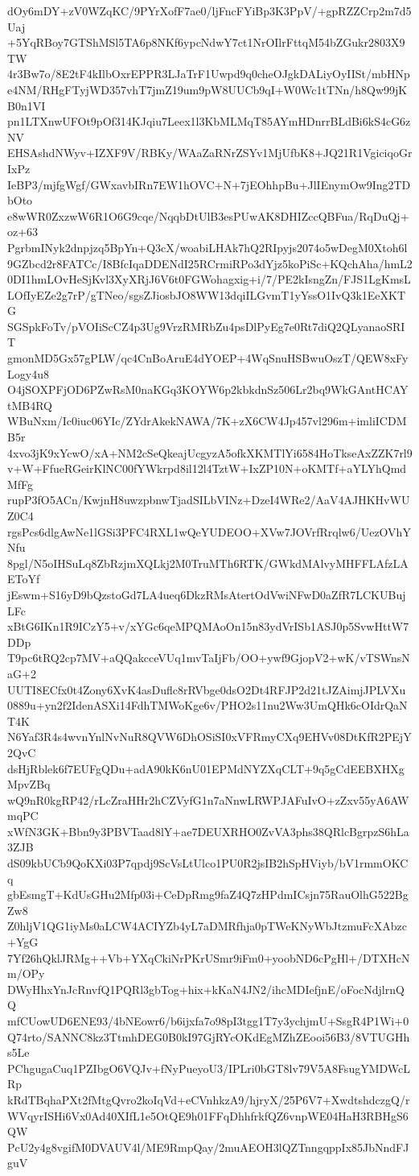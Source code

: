 dOy6mDY+zV0WZqKC/9PYrXofF7ae0/ljFncFYiBp3K3PpV/+gpRZZCrp2m7d5Uaj
+5YqRBoy7GTShMSl5TA6p8NKf6ypcNdwY7ct1NrOIlrFttqM54bZGukr2803X9TW
4r3Bw7o/8E2tF4kIlbOxrEPPR3LJaTrF1Uwpd9q0cheOJgkDALiyOyIISt/mbHNp
e4NM/RHgFTyjWD357vhT7jmZ19um9pW8UUCb9qI+W0Wc1tTNn/h8Qw99jKB0n1VI
pn1LTXnwUFOt9pOf314KJqiu7Leex1l3KbMLMqT85AYmHDnrrBLdBi6kS4cG6zNV
EHSAshdNWyv+IZXF9V/RBKy/WAaZaRNrZSYv1MjUfbK8+JQ21R1VgiciqoGrIxPz
IeBP3/mjfgWgf/GWxavbIRn7EW1hOVC+N+7jEOhhpBu+JlIEnymOw9Ing2TDbOto
e8wWR0ZxzwW6R1O6G9cqe/NqqbDtUlB3esPUwAK8DHIZccQBFua/RqDuQj+oz+63
PgrbmINyk2dnpjzq5BpYn+Q3cX/woabiLHAk7hQ2RIpyjs2074o5wDegM0Xtoh6l
9GZbcd2r8FATCc/I8BfcIqaDDENdI25RCrmiRPo3dYjz5koPiSc+KQchAha/hmL2
0DI1hmLOvHeSjKvl3XyXRjJ6V6t0FGWohagxig+i/7/PE2kIsngZn/FJS1LgKmsL
LOfIyEZe2g7rP/gTNeo/sgsZJiosbJO8WW13dqiILGvmT1yYssO1IvQ3k1EeXKTG
SGSpkFoTv/pVOIiScCZ4p3Ug9VrzRMRbZu4psDlPyEg7e0Rt7diQ2QLyanaoSRIT
gmonMD5Gx57gPLW/qc4CnBoAruE4dYOEP+4WqSnuHSBwuOszT/QEW8xFyLogy4u8
O4jSOXPFjOD6PZwRsM0naKGq3KOYW6p2kbkdnSz506Lr2bq9WkGAntHCAYtMB4RQ
WBuNxm/Ic0iuc06YIc/ZYdrAkekNAWA/7K+zX6CW4Jp457vl296m+imliICDMB5r
4xvo3jK9xYcwO/xA+NM2cSeQkeajUcgyzA5ofkXKMTlYi6584HoTkseAxZZK7rl9
v+W+FfueRGeirKlNC00fYWkrpd8il12l4TztW+IxZP10N+oKMTf+aYLYhQmdMfFg
rupP3fO5ACn/KwjnH8uwzpbnwTjadSILbVINz+DzeI4WRe2/AaV4AJHKHvWUZ0C4
rgsPcs6dlgAwNe1lGSi3PFC4RXL1wQeYUDEOO+XVw7JOVrfRrqlw6/UezOVhYNfu
8pgl/N5oIHSuLq8ZbRzjmXQLkj2M0TruMTh6RTK/GWkdMAlvyMHFFLAfzLAEToYf
jEswm+S16yD9bQzstoGd7LA4ueq6DkzRMsAtertOdVwiNFwD0aZfR7LCKUBujLFc
xBtG6IKn1R9ICzY5+v/xYGc6qeMPQMAoOn15n83ydVrISb1ASJ0p5SvwHttW7DDp
T9pc6tRQ2cp7MV+aQQakcceVUq1mvTaIjFb/OO+ywf9GjopV2+wK/vTSWnsNaG+2
UUTI8ECfx0t4Zony6XvK4asDuflc8rRVbge0dsO2Dt4RFJP2d21tJZAimjJPLVXu
0889u+yn2f2IdenASXi14FdhTMWoKge6v/PHO2s11nu2Ww3UmQHk6cOIdrQaNT4K
N6Yaf3R4s4wvnYnlNvNuR8QVW6DhOSiSI0xVFRmyCXq9EHVv08DtKfR2PEjY2QvC
dsHjRblek6f7EUFgQDu+adA90kK6nU01EPMdNYZXqCLT+9q5gCdEEBXHXgMpvZBq
wQ9nR0kgRP42/rLcZraHHr2hCZVyfG1n7aNnwLRWPJAFuIvO+zZxv55yA6AWmqPC
xWfN3GK+Bbn9y3PBVTaad8lY+ae7DEUXRHO0ZvVA3phs38QRlcBgrpzS6hLa3ZJB
dS09kbUCb9QoKXi03P7qpdj9ScVsLtUlco1PU0R2jsIB2hSpHViyb/bV1rmmOKCq
gbEsmgT+KdUsGHu2Mfp03i+CeDpRmg9faZ4Q7zHPdmICsjn75RauOlhG522BgZw8
Z0hljV1QG1iyMs0aLCW4ACIYZb4yL7aDMRfhja0pTWeKNyWbJtzmuFcXAbzc+YgG
7Yf26hQklJRMg++Vb+YXqCkiNrPKrUSmr9iFm0+yoobND6cPgHl+/DTXHcNm/OPy
DWyHhxYnJcRnvfQ1PQRl3gbTog+hix+kKaN4JN2/ihcMDIefjnE/oFocNdjlrnQQ
mfCUowUD6ENE93/4bNEowr6/b6ijxfa7o98pI3tgg1T7y3ychjmU+SsgR4P1Wi+0
Q74rto/SANNC8kz3TtmhDEG0B0kI97GjRYcOKdEgMZhZEooi56B3/8VTUGHhs5Le
PChgugaCuq1PZIbgO6VQJv+fNyPueyoU3/IPLri0bGT8lv79V5A8FsugYMDWcLRp
kRdTBqhaPXt2fMtgQvro2koIqVd+eCVnhkzA9/hjryX/25P6V7+XwdtshdczgQ/r
WVqyrISHi6Vx0Ad40XIfL1e5OtQE9h01FFqDhhfrkfQZ6vnpWE04HaH3RBHgS6QW
PcU2y4g8vgifM0DVAUV4l/ME9RmpQay/2muAEOH3lQZTnngqppIx85JbNndFJguV
